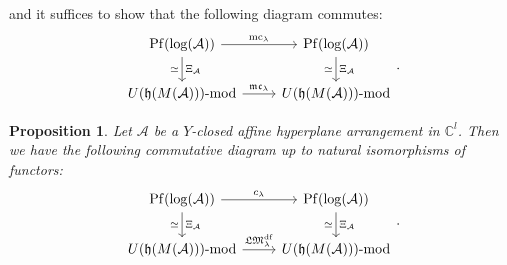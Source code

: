 \documentclass[a4paper,12pt]{article}
\newcommand{\C}{\mathbb{C}}
\newtheorem{prop}[thm]{Proposition}
\theoremstyle{definition}
\theoremstyle{remark}
\begin{document}
and it suffices to show that the following diagram commutes:
\[\begin{tikzcd}
\mathrm{Pf}(\mathrm{log}(\mathcal{A}))\arrow[r,"\mathrm{mc}_{\lambda}"]\arrow[d,"\simeq"',"\Xi_{\mathcal{A}}"]&
\mathrm{Pf}(\mathrm{log}(\mathcal{A}))\arrow[d,"\simeq"', "\Xi_{\mathcal{A}}"]\\
U(\mathfrak{h}(M(\mathcal{A})))\text{-}\mathrm{mod}\arrow[r,"\mathfrak{mc}_{\lambda}"]&
U(\mathfrak{h}(M(\mathcal{A})))\text{-}\mathrm{mod}
\end{tikzcd}.
\]
\begin{prop}
	Let $\mathcal{A}$ be a $Y$-closed affine hyperplane arrangement in $\C^{l}$.
	Then we have the following commutative diagram up to natural isomorphisms of functors:
	\[
		\begin{tikzcd}
		\mathrm{Pf}(\mathrm{log}(\mathcal{A}))\arrow[r,"c_{\lambda}"]\arrow[d,"\simeq"',"\Xi_{\mathcal{A}}"]&
		\mathrm{Pf}(\mathrm{log}(\mathcal{A}))\arrow[d,"\simeq"', "\Xi_{\mathcal{A}}"]\\
		U(\mathfrak{h}(M(\mathcal{A})))\text{-}\mathrm{mod}\arrow[r,"\mathfrak{LM}^{\mathrm{df}}_{\lambda}"]&
		U(\mathfrak{h}(M(\mathcal{A})))\text{-}\mathrm{mod}
		\end{tikzcd}.
	\]
\end{prop}
\end{document}
